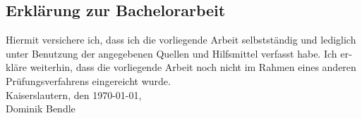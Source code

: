 \documentclass[
  paper=a4,
  titlepage,
  bibliography=totoc,
  pagesize=pdftex
]{scrartcl}
\numberwithin{figure}{section}
\numberwithin{equation}{section}
\numberwithin{table}{section}
\theoremstyle{definition}
\numberwithin{definition}{section}
\begin{document}
\clearpage
\printbibliography

\begin{otherlanguage}{ngerman}
  \section*{Erklärung zur Bachelorarbeit}
  Hiermit versichere ich, dass ich die vorliegende Arbeit selbstständig und lediglich
  unter Benutzung der angegebenen Quellen und Hilfsmittel verfasst habe. Ich erkläre
  weiterhin, dass die vorliegende Arbeit noch nicht im Rahmen eines anderen
  Prüfungsverfahrens eingereicht wurde.\\[1em]
  Kaiserslautern, den \today,\\[5em]
  Dominik Bendle
  \thispagestyle{plain}
\end{otherlanguage}
\end{document}
